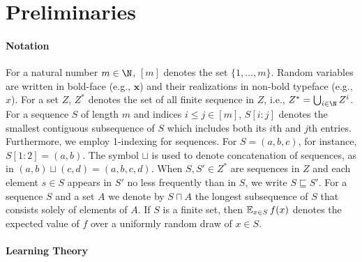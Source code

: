 \section{Preliminaries}\label{Section:Preliminaries}


\paragraph{Notation}

For a natural number $m \in \N$, $[m]$ denotes the set $\{1, \ldots, m\}$. Random variables are written in bold-face (e.g., $\mathbf{x}$) and their realizations in non-bold typeface (e.g., $x$). For a set $Z$, $Z^*$ denotes the set of all finite sequence in $Z$, i.e., $Z^* = \bigcup_{i \in \N} Z^i$. For a sequence $S$ of length $m$ and indices $i \leq  j \in [m]$, $S[i:j]$ denotes the smallest contiguous subsequence of $S$ which includes both its $i$th and $j$th entries. Furthermore, we employ 1-indexing for sequences. For $S = (a, b, c)$, for instance, $S[1:2] = (a, b)$. The symbol $\sqcup$ is used to denote concatenation of sequences, as in $(a, b) \sqcup (c, d) = (a, b, c, d)$. When $S, S' \in Z^*$ are sequences in $Z$ and each element $s \in S$ appears in $S'$ no less frequently than in $S$, we write $S \sqsubseteq S'$.
For a sequence $S$ and a set $A$
we denote by $S \sqcap A$ the longest subsequence of $S$
that consists solely of elements of $A.$
If $S$ is a finite set, then $\operatorname*{\mathbb{E}}_{x \in S} f(x)$ denotes the expected value of $f$ over a uniformly random draw of $x \in S$. 

\paragraph{Learning Theory}


